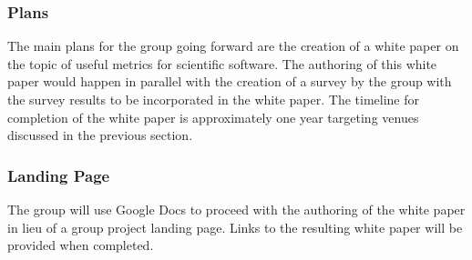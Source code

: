 \subsubsection{Plans}

The main plans for the group going forward are the creation of a white paper on the topic of useful metrics for scientific software.  The authoring of this white paper would happen in parallel with the creation of a survey by the group with the survey results to be incorporated in the white paper.  The timeline for completion of the white paper is approximately one year targeting venues discussed in the previous section.

\subsubsection{Landing Page}

The group will use Google Docs to proceed with the authoring of the white paper in lieu of a group project landing page.  Links to the resulting white paper will be provided when completed.

